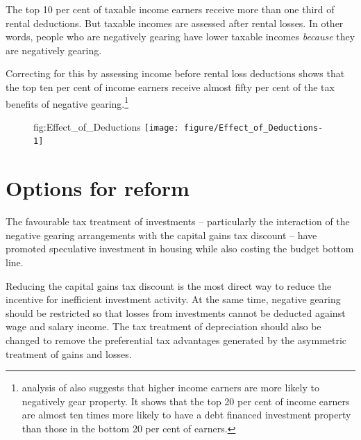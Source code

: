 \documentclass{grattan}\usepackage[]{graphicx}\usepackage[]{color}
\newcommand\gao{Grattan analysis of}
\begin{document}
The top 10 per cent of taxable income earners receive more than one third of rental deductions. But taxable incomes are assessed after rental losses. In other words, people who are negatively gearing have lower taxable incomes \emph{because} they are negatively gearing.

Correcting for this by assessing income before rental loss deductions shows that the top ten per cent of income earners receive almost fifty per cent of the tax benefits of negative gearing.\footnote{\textcite{RBA2015} analysis of \textcite{HILDA2015} also suggests that higher income earners are more likely to negatively gear property. It shows that the top 20 per cent of income earners are almost ten times more likely to have a debt financed investment property than those in the bottom 20 per cent of earners.} 





\begin{figure}
  {fig:Effect_of_Deductions}
\texttt{[image: figure/Effect\_of\_Deductions-1]}

\source{\gao\ \textcite{ATO2013i}}
\end{figure}

\section{Options for reform}
The favourable tax treatment of investments -- particularly the interaction of the negative gearing arrangements with the capital gains tax discount -- have promoted speculative investment in housing while also costing the budget bottom line. 

Reducing the capital gains tax discount is the most direct way to reduce the incentive for inefficient investment activity. At the same time, negative gearing should be restricted so that losses from investments cannot be deducted against wage and salary income. The tax treatment of depreciation should also be changed to remove the preferential tax advantages generated by the asymmetric treatment of gains and losses. 
\end{document}
